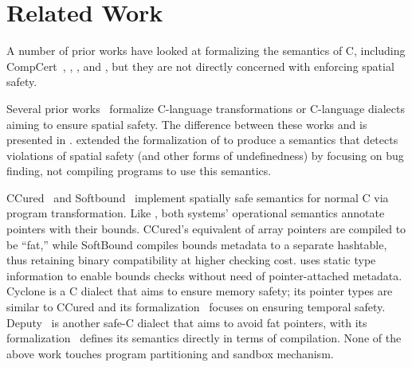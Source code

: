\section{Related Work}
\label{sec:related}

A number of prior works have looked at formalizing the semantics of C,
including CompCert~\cite{Blazy2009,leroy:hal-00703441},
\citet{ellison-rosu-2012-popl}, \citet{Kang:2015:FCM:2813885.2738005},
and \citet{10.1145/2980983.2908081, Memarian:2019:ECS:3302515.3290380},
but they are not directly concerned with enforcing
spatial safety.

%
Several prior works~\cite{li22checkedc} formalize C-language transformations or C-language
dialects aiming to ensure spatial safety.
The difference between these works and \systemname is presented in .
%
\citet{10.1145/2813885.2737979} extended the formalization
of \citet{ellison-rosu-2012-popl} to produce a semantics that detects
violations of spatial safety (and other forms of undefinedness) 
by focusing on bug finding, not compiling programs to use this semantics.

CCured~\cite{Necula2005} and Softbound~\cite{softbound} implement
spatially safe semantics for normal C via program transformation. Like
\lang, both systems' operational semantics annotate pointers with
their bounds. CCured's equivalent of array pointers are compiled to be
``fat,'' while SoftBound compiles bounds metadata to a separate
hashtable, thus retaining binary compatibility at higher checking
cost. \systemname uses static type information to enable bounds checks
without need of pointer-attached metadata.
Cyclone \cite{Jim2002,GrossmanMJHWC02} is a C dialect that aims to
ensure memory safety; its pointer types are similar to
CCured and its formalization~\cite{GrossmanMJHWC02} focuses on ensuring temporal safety. 
Deputy~\cite{Feng2006,Condit2007}
is another safe-C dialect that aims to avoid fat pointers,
with its formalization~\cite{Condit2007} defines its
semantics directly in terms of compilation.
None of the above work touches program partitioning and sandbox mechanism. 


